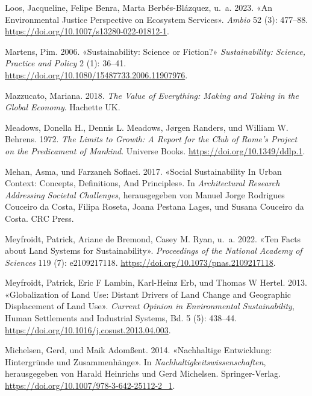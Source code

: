 \documentclass[
  nswissgerman,
  a4paper,
  openany]{book}
\newlength{\cslhangindent}
\newenvironment{CSLReferences}[2] %
 {\begin{list}{}{%
  \setlength{\itemindent}{0pt}
  \setlength{\leftmargin}{0pt}
  \setlength{\parsep}{0pt}
  \ifodd #1
   \setlength{\leftmargin}{\cslhangindent}
   \setlength{\itemindent}{-1\cslhangindent}
  \fi
  \setlength{\itemsep}{#2\baselineskip}}}
 {\end{list}}
\begin{document}
\begin{CSLReferences}{1}{1}
Loos, Jacqueline, Felipe Benra, Marta Berbés-Blázquez, u.~a. 2023. {«An
Environmental Justice Perspective on Ecosystem Services»}. \emph{Ambio}
52 (3): 477--88. \url{https://doi.org/10.1007/s13280-022-01812-1}.

Martens, Pim. 2006. {«Sustainability: Science or Fiction?»}
\emph{Sustainability: Science, Practice and Policy} 2 (1): 36--41.
\url{https://doi.org/10.1080/15487733.2006.11907976}.

Mazzucato, Mariana. 2018. \emph{The Value of Everything: {Making} and
Taking in the Global Economy}. Hachette UK.

Meadows, Donella H., Dennis L. Meadows, Jørgen Randers, und William W.
Behrens. 1972. \emph{The {Limits} to {Growth}: {A} Report for the {Club}
of {Rome}'s {Project} on the {Predicament} of {Mankind}}. Universe
Books. \url{https://doi.org/10.1349/ddlp.1}.

Mehan, Asma, und Farzaneh Soflaei. 2017. {«Social {Sustainability In
Urban Context}: {Concepts}, {Definitions}, {And Principles}»}. In
\emph{Architectural {Research Addressing Societal Challenges}},
herausgegeben von Manuel Jorge Rodrigues Couceiro da Costa, Filipa
Roseta, Joana Pestana Lages, und Susana Couceiro da Costa. CRC Press.

{Meyfroidt, Patrick, Ariane de Bremond, Casey M. Ryan, u.~a.} 2022.
{«Ten Facts about Land Systems for Sustainability»}. \emph{Proceedings
of the National Academy of Sciences} 119 (7): e2109217118.
\url{https://doi.org/10.1073/pnas.2109217118}.

Meyfroidt, Patrick, Eric F Lambin, Karl-Heinz Erb, und Thomas W Hertel.
2013. {«Globalization of Land Use: Distant Drivers of Land Change and
Geographic Displacement of Land Use»}. \emph{Current Opinion in
Environmental Sustainability}, Human Settlements and Industrial Systems,
Bd. 5 (5): 438--44. \url{https://doi.org/10.1016/j.cosust.2013.04.003}.

Michelsen, Gerd, und Maik Adomßent. 2014. {«{Nachhaltige Entwicklung:
Hintergr{ü}nde und Zusammenh{ä}nge}»}. In
\emph{{Nachhaltigkeitswissenschaften}}, herausgegeben von Harald
Heinrichs und Gerd Michelsen. Springer-Verlag.
\url{https://doi.org/10.1007/978-3-642-25112-2_1}.


\end{CSLReferences}
\end{document}
